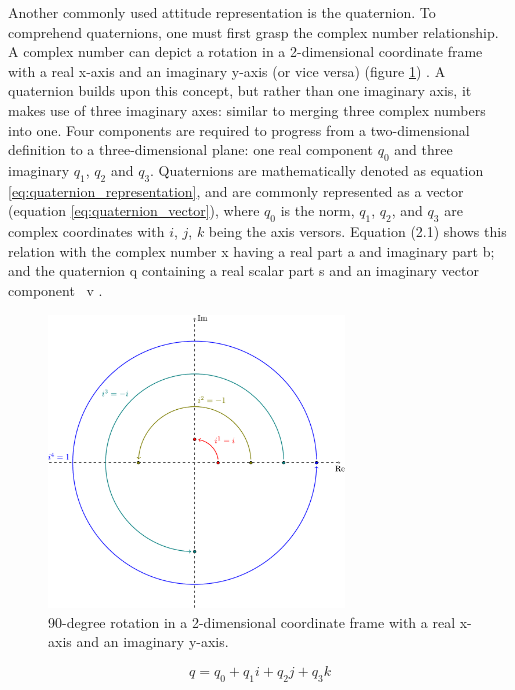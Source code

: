 Another commonly used attitude representation is the quaternion. To comprehend quaternions, one must first grasp the complex number relationship. A complex number can depict a rotation in a 2-dimensional coordinate frame with a real x-axis and an imaginary y-axis (or vice versa) (figure \ref{fig:complex_rotation}) \cite{lee2008representing}. A quaternion builds upon this concept, but rather than one imaginary axis, it makes use of three imaginary axes: similar to merging three complex numbers into one. Four components are required to progress from a two-dimensional definition to a three-dimensional plane: one real component $q_0$ and three imaginary $q_1$, $q_2$ and $q_3$. Quaternions are mathematically denoted as equation \ref{eq:quaternion_representation}, and are commonly represented as a vector (equation \ref{eq:quaternion_vector}), where $q_0$ is the norm, $q_1$, $q_2$, and $q_3$ are complex coordinates with $i$, $j$, $k$ being the axis versors. Equation (2.1) shows this relation with the complex number x having a real part a and imaginary part b; and the quaternion q containing a real scalar part s and an imaginary vector component ~v \cite{mukundan2002quaternions}.

\begin{figure}[!h]
  \centering
  \includegraphics[width=0.7\textwidth]{figures/complex_rotation.pdf}
  \caption{90-degree rotation in a 2-dimensional coordinate frame with a real x-axis and an imaginary y-axis. }
  \label{fig:complex_rotation}
\end{figure}

\begin{equation}
  q = q_0 + q_1 i + q_2 j + q_3 k
  \label{eq:quaternion_representation}
\end{equation}

